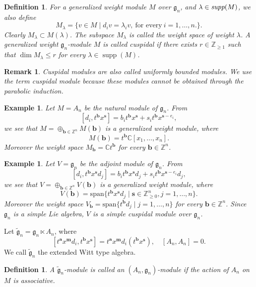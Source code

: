 \documentclass[12pt,a4paper]{amsart}
\def\mg{g}%
\newtheorem{example}[theorem]{Example}%
\newtheorem{remark}[theorem]{Remark}%
\numberwithin{equation}{section}
\newtheorem{definition}[theorem]{Definition}
\newcommand{\C}{\mathbb C}
\newcommand{\Z}{\mathbb{Z}}
\def\mg{\mathfrak{g}}
\def\ba{\mathbf{a}}
\def\bs{\mathbf{s}}
\def\bm{\mathbf{m}}
\def\bb{\mathbf{b}}
\begin{document}
\begin{definition}For a  generalized weight module $M$ over $\mg_n$, and $\lambda\in \emph{supp}(M)$, we also define
$$M_\lambda=\{v \in M \mid d_iv=\lambda_i v,\  \text{for every}\ i=1,\dots,n.\}.$$
Clearly $M_\lambda\subset M(\lambda)$.
The subspace \(M_\lambda\) is called the weight space of weight
\(\lambda\). A generalized weight \(\mg_n\)-module \(M\) is called
cuspidal if there exists \(r\in\Z_{\geq1}\) such that
\(\dim M_\lambda\leq r\) for every
\(\lambda\in\operatorname{supp}(M)\).
\end{definition}

\begin{remark}
Cuspidal modules are also called uniformly bounded modules.
We use the term cuspidal module because these modules cannot be obtained through the parabolic induction.
\end{remark}

\begin{example}
Let $M=A_n$ be the natural module of $\mg_n$. From
$$[d_{i},t^{\bb}x^{\bs}]=
b_it^{\bb}x^{\bs}+s_it^{\bb}x^{\bs-e_i},
$$
we see that $M=\oplus_{\bb\in \Z^n} M(\bb)$ is a generalized weight module, where
$$M(\bb)=t^{\bb}\C[x_1,\dots,x_n].
$$
Moreover the weight space $M_\bb=\C t^{\bb}$ for every $\bb\in \Z^n$.
\end{example}

\begin{example}
Let $V=\mg_n$ be the adjoint module of $\mg_n$. From
$$[d_{i},t^{\bb}x^{\bs}d_{j}]=
b_it^{\bb}x^{\bs}d_j+s_it^{\bb}x^{\bs-e_i}d_j,
$$
we see that $V=\oplus_{\bb\in \Z^n} V(\bb)$ is a generalized weight module, where
$$V(\bb)=\mathrm{span}
\{t^{\bb}x^{\bs}d_{j}\mid  \bs\in\Z_{\geq 0}^n, j=1,\dots,n\}.
$$
Moreover the weight space $V_\bb=\mathrm{span}
\{t^{\bb}d_{j}\mid  j=1,\dots,n\}$ for every $\bb\in \Z^n$.
Since $\mg_n$ is a simple Lie algebra,  $V$ is a simple cuspidal module over  $\mg_n$.
\end{example}

Let \(\widetilde{\mg}_n=\mg_n\ltimes A_n\), where
\[
[t^{\ba}x^{\bm}d_i,t^{\bb}x^{\bs}]
=t^{\ba}x^{\bm}d_i(t^{\bb}x^{\bs}),\quad [A_n,A_n]=0.
\]
We call \(\widetilde{\mg}_n\) the extended Witt type algebra.

\begin{definition}A $\widetilde{\mg}_n$-module is called an $(A_n,\mg_n)$-module
if the action of $A_n$ on $M$ is associative.
\end{definition}
\end{document}
